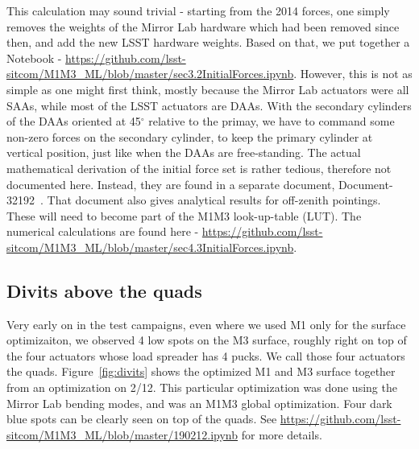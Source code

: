 \documentclass [twoside,openbib,12pt]{article}
\begin{document}
This calculation may sound trivial - starting from the 2014 forces,
one simply removes the weights of the Mirror Lab hardware which had been removed
since then, and add the new LSST hardware weights.
Based on that, we put together a Notebook - \url{https://github.com/lsst-sitcom/M1M3_ML/blob/master/sec3.2InitialForces.ipynb}.
However, this is not as simple as one might first think, mostly
because the Mirror Lab actuators were all SAAs, while most of the LSST
actuators are DAAs. With the secondary cylinders of the DAAs oriented at
45$^\circ$ relative to the primay, we have to command some non-zero
forces on the secondary cylinder, to keep the primary cylinder at
vertical position, just like when the DAAs are free-standing.
The actual mathematical derivation of the initial force set is rather tedious,
therefore not documented here. Instead, they are found in a separate
document,
Document-32192~\cite{m1m3initF}.
That document also gives analytical results for off-zenith
pointings. These will need to become part of the M1M3 look-up-table (LUT).
The numerical calculations are found here - \url{https://github.com/lsst-sitcom/M1M3_ML/blob/master/sec4.3InitialForces.ipynb}.


\subsection{Divits above the quads}
\label{sec:divits}

Very early on in the test campaigns, even where we used M1 only for
the surface optimizaiton, we observed 4 low spots on the M3
surface, roughly right on top of the four actuators whose load
spreader has 4 pucks. We call those four actuators the quads.
Figure~\ref{fig:divits} shows the optimized M1 and M3 surface together from
an optimization on 2/12. This particular optimization was done using
the Mirror Lab bending modes, and was an M1M3 global
optimization. Four dark blue spots can be clearly seen on top of the quads.
See \url{https://github.com/lsst-sitcom/M1M3_ML/blob/master/190212.ipynb} for
more details.
\end{document}
